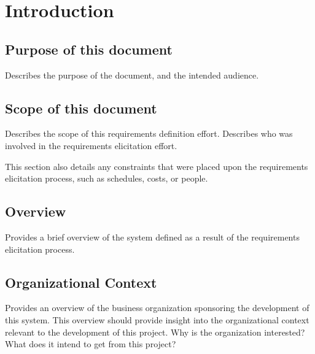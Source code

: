 







\section{Introduction}

\subsection{Purpose of this document}
Describes the purpose of the document, and the intended audience.

\subsection{Scope of this document}
Describes the scope of this requirements definition effort. Describes who
was involved in the requirements elicitation effort.

This section also details any constraints that were placed upon the
requirements elicitation process, such as schedules, costs, or people.

\subsection{Overview}
Provides a brief overview of the system defined as a result of the
requirements elicitation process.

\subsection{Organizational Context}
Provides an overview of the business organization sponsoring the
development of this system. This overview should provide insight into the
organizational context relevant to the development of this project. Why is
the organization interested? What does it intend to get from this project?

